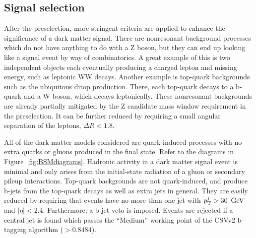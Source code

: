 \subsection{Signal selection}
\label{ss:zlldmsigsel}
After the preselection, more stringent criteria are applied to enhance the significance of a dark matter signal.
There are nonresonant background processes which do not have anything to do with a Z boson,
but they can end up looking like a signal event by way of combinatorics.
A great example of this is two independent objects each eventually producing a charged lepton and missing energy, such as leptonic WW decays.
Another example is top-quark backgrounds such as the ubiquitous ditop production.
There, each top-quark decays to a b-quark and a W boson, which decays leptonically.
These nonresonant backgrounds are already partially mitigated by the Z candidate mass window requirement in the preselection.
It can be further reduced by requiring a small angular separation of the leptons, $\Delta R < 1.8$.

All of the dark matter models considered are quark-induced processes 
with no extra quarks or gluons produced in the final state.
Refer to the diagrams in Figure~\ref{fig:BSMdiagrams}.
Hadronic activity in a dark matter signal event is minimal and only arises from the initial-state radiation of a gluon or secondary pileup interactions.
Top-quark backgrounds are not quark-induced, and produce b-jets from the top-quark decays as well as extra jets in general.
They are easily reduced by requiring that events have no more than one jet with $p_{\mathrm{T}}^{j} > 30~\,\text{Ge\hspace{-.08em}V}$ and $|\eta|<2.4$.
Furthermore, a b-jet veto is imposed.
Events are rejected if a central jet is found which passes the ``Medium'' working point of the CSVv2 b-tagging algorithm ($>0.8484$).


